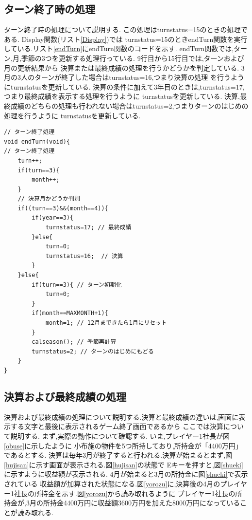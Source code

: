 \documentclass[a4j]{jarticle}
\begin{document}
    \subsection{ターン終了時の処理}
    ターン終了時の処理について説明する. この処理はturnstatus=15のときの処理である. Display関数(リスト\ref{Display})では
    turnstatus=15のときendTurn関数を実行している.リスト\ref{endTurn}にendTurn関数のコードを示す.
    endTurn関数では,ターン,月,季節の3つを更新する処理行っている. 9行目から15行目では,ターンおよび月の更新結果から
    決算または最終成績の処理を行うかどうかを判定している. 3月の3人のターンが終了した場合はturnstatus=16,つまり決算の処理
    を行うようにturnstatusを更新している. 決算の条件に加えて3年目のときは,turnstatus=17,つまり最終成績を表示する処理を行うように
    turnstatusを更新している. 決算,最終成績のどちらの処理も行われない場合はturnstatus=2,つまりターンのはじめの処理を行うように
    turnstatusを更新している.
    \begin{lstlisting}[basicstyle=\ttfamily\footnotesize, frame=single,label=endTurn,caption=endTurn関数]
// ターン終了処理
void endTurn(void){
// ターン終了処理
    turn++;
    if(turn==3){
        month++;
    }
    // 決算月かどうか判別
    if((turn==3)&&(month==4)){
        if(year==3){
            turnstatus=17; // 最終成績
        }else{
            turn=0;
            turnstatus=16;  // 決算
        }
    }else{
        if(turn==3){ // ターン初期化
            turn=0;
        }
        if(month==MAXMONTH+1){
            month=1; // 12月まできたら1月にリセット
        }
        calseason(); // 季節再計算
        turnstatus=2; // ターンのはじめにもどる
    }
}
    \end{lstlisting}

    \subsection{決算および最終成績の処理}
    決算および最終成績の処理について説明する.決算と最終成績の違いは,画面に表示する文字と最後に表示されるゲーム終了画面であるから
    ここでは決算について説明する. まず,実際の動作について確認する. いま,プレイヤー1社長が図\ref{obuse}に示したように
    小布施の物件を5つ所持しており,所持金が「4400万円」であるとする.
    決算は毎年3月が終了すると行われる.決算が始まるとまず,図\ref{hujisan}に示す画面が表示される.図\ref{hujisan}の状態で
    Eキーを押すと,図\ref{shueki}に示すように収益額が表示される. 4月が始まると3月の所持金に図\ref{shueki}で表示されている
    収益額が加算された状態になる.図\ref{yorozu}に,決算後の4月のプレイヤー1社長の所持金を示す.図\ref{yorozu}から読み取れるように
    プレイヤー1社長の所持金が,3月の所持金4400万円に収益額3600万円を加えた8000万円になっていることが読み取れる.
\end{document}
